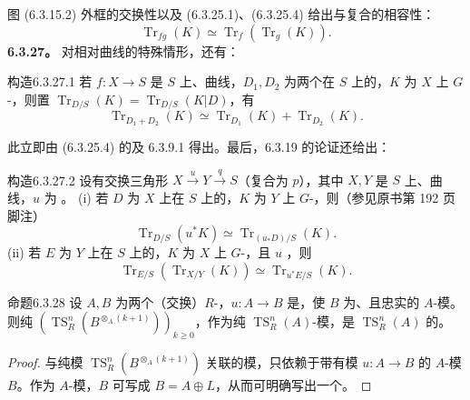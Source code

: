 图 (6.3.15.2) 外框的交换性以及 (6.3.25.1)、(6.3.25.4) 给出与复合的相容性：
\[\operatorname{Tr}_{fg}(K)\simeq\operatorname{Tr}_f(\operatorname{Tr}_g(K)).\]
\textbf{6.3.27。} 对相对曲线的特殊情形，还有：
\begin{SGAresult}{构造}{6.3.27.1}
若 $f:X\to S$ 是 $S$ 上、曲线，$D_1,D_2$ 为两个在 $S$ 上的，$K$ 为 $X$ 上 $G$-，则置 $\operatorname{Tr}_{D/S}(K)=\operatorname{Tr}_{D/S}(K|D)$，有
\[\operatorname{Tr}_{D_1+D_2}(K)\simeq\operatorname{Tr}_{D_1}(K)+\operatorname{Tr}_{D_2}(K).\]
\end{SGAresult}
此立即由 (6.3.25.4) 的及 6.3.9.1 得出。最后，6.3.19 的论证还给出：
\begin{SGAresult}{构造}{6.3.27.2}
设有交换三角形 $X\xrightarrow{u}Y\xrightarrow{q}S$（复合为 $p$），其中 $X,Y$ 是 $S$ 上、曲线，$u$ 为
。
(i) 若 $D$ 为 $X$ 上在 $S$ 上的，$K$ 为 $Y$ 上 $G$-，则（参见原书第 192 页脚注）
\[\operatorname{Tr}_{D/S}(u^*K)\simeq\operatorname{Tr}_{(u_*D)/S}(K).\]
(ii) 若 $E$ 为 $Y$ 上在 $S$ 上的，$K$ 为 $X$ 上 $G$-，且 $u$ ，则
\[\operatorname{Tr}_{E/S}(\operatorname{Tr}_{X/Y}(K))\simeq\operatorname{Tr}_{u^*E/S}(K).\]
\end{SGAresult}
\begin{SGAresult}{命题}{6.3.28}
设 $A,B$ 为两个（交换）$R$-，$u:A\to B$ 是，使 $B$ 为、且忠实的 $A$-模。则纯 $(\operatorname{TS}_R^n(B^{\otimes_A(k+1)}))_{k\ge0}$，作为纯 $\operatorname{TS}_R^n(A)$-模，是 $\operatorname{TS}_R^n(A)$ 的。
\end{SGAresult}
\begin{proof}
与纯模 $\operatorname{TS}_R^n(B^{\otimes_A(k+1)})$ 关联的模，只依赖于带有模 $u:A\to B$ 的 $A$-模 $B$。作为 $A$-模，$B$ 可写成 $B=A\oplus L$，从而可明确写出一个。
\end{proof}
